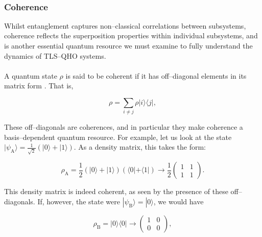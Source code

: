 \documentclass[11pt]{article}
\begin{document}
\\
\subsubsection{Coherence} \label{sec:theory_sub_coh}

Whilst entanglement captures non--classical correlations between subsystems, coherence reflects the superposition properties within individual subsystems, and is another essential quantum resource we must examine to fully understand the dynamics of TLS--QHO systems.\\
\\
A quantum state $\rho$ is said to be coherent if it has off--diagonal elements in its matrix form \cite{Coherence2017-Colloquium}. That is,

\begin{equation}
    \rho = \sum_{i\neq j}\rho|i\rangle\langle j|,
\end{equation}

These off--diagonals are coherences, and in particular they make coherence a basis--dependent quantum resource. For example, let us look at the state $|\psi_{\scriptscriptstyle \text{A}}\rangle = \frac{1}{\sqrt{2}}(|0\rangle + |1\rangle)$. As a density matrix, this takes the form:

\begin{equation*}
    \rho_{\scriptscriptstyle \text{A}} = \frac{1}{2}(|0\rangle + |1\rangle)(\langle0| +\langle1|) \rightarrow \frac{1}{2}
    \begin{pmatrix}
        1 & 1 \\
        1 & 1
    \end{pmatrix}.
\end{equation*}

This density matrix is indeed coherent, as seen by the presence of these off--diagonals. If, however, the state were $|\psi_{\scriptscriptstyle \text{B}}\rangle = |0\rangle$, we would have

\begin{equation*}
    \rho_{\scriptscriptstyle \text{B}} = |0\rangle\langle0| \rightarrow 
    \begin{pmatrix}
        1 & 0 \\
        0 & 0
    \end{pmatrix},
\end{equation*}
\end{document}
